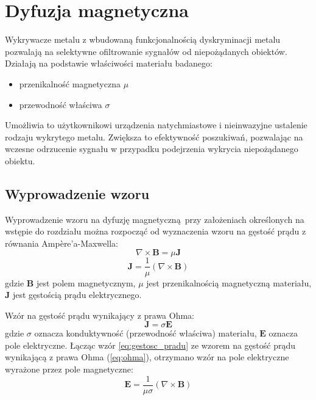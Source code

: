 \section{Dyfuzja magnetyczna}

Wykrywacze metalu z wbudowaną funkcjonalnością dyskryminacji metalu pozwalają na selektywne ofiltrowanie sygnałów od niepożądanych obiektów.
Działają na podstawie właściwości materiału badanego:
\begin{itemize}
    \item przenikalność magnetyczna $\mu$
    \item przewodność właściwa $\sigma$
\end{itemize}
Umożliwia to użytkownikowi urządzenia natychmiastowe i nieinwazyjne ustalenie rodzaju wykrytego metalu.
Zwiększa to efektywność poszukiwań, pozwalając na wczesne odrzucenie sygnału w przypadku podejrzenia wykrycia niepożądanego obiektu.

\subsection{Wyprowadzenie wzoru}

Wyprowadzenie wzoru na dyfuzję magnetyczną przy założeniach określonych na wstępie do rozdziału można rozpocząć od wyznaczenia wzoru na gęstość prądu z równania Ampère'a-Maxwella:
\begin{equation}
    \label{eq:ampere}
    \nabla \times \mathbf{B} = \mu \mathbf{J}
\end{equation}
\begin{equation}
    \label{eq:gestosc_pradu}
    \mathbf{J} = \frac{1}{\mu} (\nabla \times \mathbf{B})
\end{equation}
gdzie $\mathbf{B}$ jest polem magnetycznym, $\mu$ jest przenikalnością magnetyczną materiału, $\mathbf{J}$ jest gęstością prądu elektrycznego.

Wzór na gęstość prądu wynikający z prawa Ohma:
\begin{equation}    
    \label{eq:ohma}
    \mathbf{J} = \sigma \mathbf{E}
\end{equation}
gdzie $\sigma$ oznacza konduktywność (przewodność właściwa) materiału, $\mathbf{E}$ oznacza pole elektryczne.
Łącząc wzór \ref{eq:gestosc_pradu} ze wzorem na gęstość prądu wynikającą z prawa Ohma (\ref{eq:ohma}), otrzymano wzór na pole elektryczne wyrażone przez pole magnetyczne:
\begin{equation}
     \mathbf{E} = \frac{1}{\mu \sigma} (\nabla \times \mathbf{B})
     \label{eq:elektryczne_przez_magnetyczne}
\end{equation}

